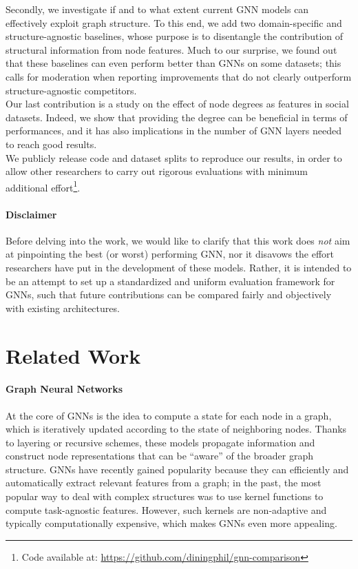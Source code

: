 \documentclass{article}
\newcommand{\quotes}[1]{``#1''}
\begin{document}
Secondly, we investigate if and to what extent current GNN models can effectively exploit graph structure. To this end, we add two domain-specific and structure-agnostic baselines, whose purpose is to disentangle the contribution of structural information from node features. Much to our surprise, we found out that these baselines can even perform better than GNNs on some datasets; this calls for moderation when reporting improvements that do not clearly outperform structure-agnostic competitors. \\ Our last contribution is a study on the effect of node degrees as features in social datasets. Indeed, we show that providing the degree can be beneficial in terms of performances, and it has also implications in the number of GNN layers needed to reach good results. \\
We publicly release code and dataset splits to reproduce our results, in order to allow other researchers to carry out rigorous evaluations with minimum additional effort\footnote{Code available at: \url{https://github.com/diningphil/gnn-comparison}}.

\paragraph{Disclaimer} Before delving into the work, we would like to clarify that this work does \emph{not} aim at pinpointing the best (or worst) performing GNN, nor it disavows the effort researchers have put in the development of these models. Rather, it is intended to be an attempt to set up a standardized and uniform evaluation framework for GNNs, such that future contributions can be compared fairly and objectively with existing architectures.
 \section{Related Work}
\paragraph{Graph Neural Networks} At the core of GNNs is the idea to compute a state for each node in a graph, which is iteratively updated according to the state of neighboring nodes. Thanks to layering \citep{nn4g-micheli} or recursive \citep{scarselli2009graph} schemes, these models propagate information and construct node representations that can be \quotes{aware} of the broader graph structure. GNNs have recently gained popularity because they can efficiently and automatically extract relevant features from a graph; in the past, the most popular way to deal with complex structures was to use kernel functions \citep{wl-kernel} to compute task-agnostic features. However, such kernels are  non-adaptive and typically computationally expensive, which makes GNNs even more appealing.
\end{document}
